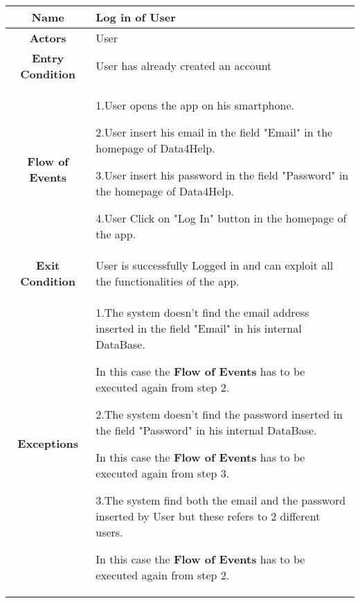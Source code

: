 \subsubsection{}
 \begin{table}[h!]
   \centering
    \begin{tabularx}{\linewidth}{|c|X|}
         \hline
         \textbf{Name} & Log in of User \\
	\hline
	\textbf{Actors} & User \\
	\hline
	\textbf{Entry Condition} & User has already created an account\\
	\hline
	\textbf{Flow of Events} & 1.User opens the app on his smartphone.

					2.User insert his email in the field "Email" in the homepage of Data4Help.

					3.User insert his password in the field "Password" in the homepage of Data4Help.

					4.User Click on "Log In" button in the homepage of the app.\\
	\hline
	\textbf{Exit Condition} & User is successfully Logged in and can exploit all the functionalities of the app. \\
	\hline
	\textbf{Exceptions} & 1.The system doesn't find the email address inserted in the field "Email" in his internal DataBase. 
				
				In this case the \textbf{Flow of Events} has to be executed again from step 2. 

				2.The system doesn't find the password inserted in the field "Password" in his internal DataBase.

				 In this case the \textbf{Flow of Events} has to be executed again from step 3. 

				3.The system find both the email and the password inserted by User but these refers to 2 different users.               

				In this case the \textbf{Flow of Events} has to be executed again from step 2. \\ 
        \hline
      \end{tabularx}
      \end{table}

